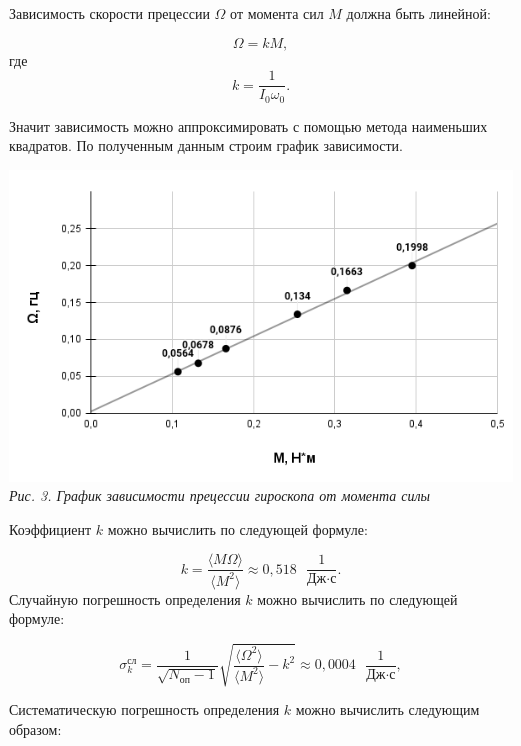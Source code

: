\documentclass[12pt, a4paper]{article}
\begin{document}
Зависимость скорости прецессии $ \Omega $ от момента сил $ M $ должна быть линейной:

\begin{equation}
\Omega = kM,
\end{equation}
где
\begin{equation}
k = \frac{1}{I_0\omega_0}.
\end{equation}

Значит зависимость можно аппроксимировать с помощью метода наименьших квадратов.
По полученным данным строим график зависимости.

\begin{center}
    \includegraphics[scale=0.9]{Pics/picture3.png} \\
    \textit{\textcolor[HTML]{000000}{Рис. 3. График зависимости прецессии гироскопа от момента силы}}
\end{center}

Коэффициент $ k $ можно вычислить по следующей формуле:

\begin{equation}
k = \frac{\langle M\Omega\rangle}{\langle M^2 \rangle} \approx 0,518 \text{ } \frac{1}{\text{Дж} \cdot \text{с}}.
\end{equation}
Случайную погрешность определения $ k $ можно вычислить по следующей формуле:

\begin{equation}
\sigma^\text{сл}_k = \frac{1}{\sqrt{N_\text{оп}-1}} \sqrt{\frac{\langle \Omega^2 \rangle}{\langle M^2 \rangle} - k^2} \approx 0,0004 \text{ } \frac{1}{\text{Дж} \cdot \text{с}},
\end{equation}

Систематическую погрешность определения $ k $ можно вычислить следующим образом:
\end{document}
